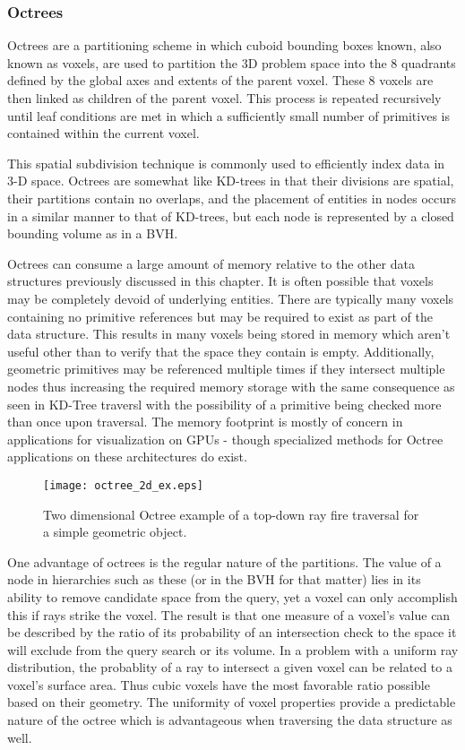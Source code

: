 \subsubsection{Octrees}%
\label{subsec:octree}

Octrees are a partitioning scheme in which cuboid bounding boxes known, also
known as voxels, are used to partition the 3D problem space into the 8 quadrants
defined by the global axes and extents of the parent voxel. These 8 voxels are
then linked as children of the parent voxel. This process is repeated
recursively until leaf conditions are met in which a sufficiently small number
of primitives is contained within the current voxel.

This spatial subdivision technique is commonly used to efficiently index
data in 3-D space.\cite{Glassner_1989} Octrees are somewhat like KD-trees in
that their divisions are spatial, their partitions contain no overlaps, and the
placement of entities in nodes occurs in a similar manner to that of KD-trees,
but each node is represented by a closed bounding volume as in a BVH.

Octrees can consume a large amount of memory relative to the other data
structures previously discussed in this chapter. It is often possible that
voxels may be completely devoid of underlying entities. There are typically many
voxels containing no primitive references but may be required to exist as part
of the data structure. This results in many voxels being stored in memory which
aren't useful other than to verify that the space they contain is
empty. Additionally, geometric primitives may be referenced multiple times if
they intersect multiple nodes thus increasing the required memory storage with
the same consequence as seen in KD-Tree traversl with the possibility of a
primitive being checked more than once upon traversal. The memory footprint is
mostly of concern in applications for visualization on GPUs - though specialized methods for Octree applications on these architectures do exist.

\begin{figure}[H]
  \centering
  \texttt{[image: octree\_2d\_ex.eps]}
  \caption{Two dimensional Octree example of a top-down ray fire traversal for a simple geometric object.}
  \label{fig:2D_octree}
\end{figure}

One advantage of octrees is the regular nature of the partitions. The
value of a node in hierarchies such as these (or in the BVH for that matter)
lies in its ability to remove candidate space from the query, yet a voxel can
only accomplish this if rays strike the voxel. The result is that one measure of
a voxel's value can be described by the ratio of its probability of an
intersection check to the space it will exclude from the query search or its
volume. In a problem with a uniform ray distribution, the probablity of a ray to
intersect a given voxel can be related to a voxel's surface area. Thus cubic
voxels have the most favorable ratio possible based on their geometry. The
uniformity of voxel properties provide a predictable nature of the octree which
is advantageous when traversing the data structure as well.

